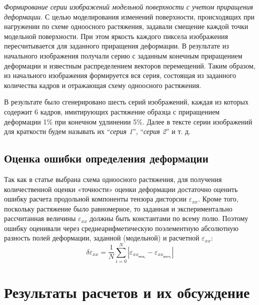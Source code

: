 \documentclass[a4paper]{jctart10}
\begin{document}
{\it Формирование серии изображений модельной поверхности с учетом приращения деформации.} С целью моделирования изменений поверхности, происходящих при нагружении по схеме одноосного растяжения, задавали смещение каждой точки модельной поверхности. При этом яркость каждого пиксела изображения пересчитывается для заданного приращения деформации. В результате из начального изображения получали серию с заданным конечным приращением деформации и известным распределением векторов перемещений. Таким образом, из начального изображения формируется вся серия, состоящая из заданного количества кадров и отражающая схему одноосного растяжения.

В результате было сгенерировано шесть серий изображений, каждая из которых содержит 6 кадров, имитирующих растяжение образца с приращением деформации 1\% при конечном удлинении 5\%. Далее в тексте серии изображений для краткости будем называть их ``{\it серия 1}'', ``{\it серия 2}'' и т. д.

\subsection{Оценка ошибки определения деформации}

Так как в статье выбрана схема одноосного растяжения, для получения количественной оценки «точности» оценки деформации достаточно оценить ошибку расчета продольной компоненты тензора дисторсии $\varepsilon_{xx}$. Кроме того, поскольку растяжение было равномерное, то заданная и экспериментально рассчитанная величины $\varepsilon_{xx}$ должны быть константами по всему полю. Поэтому ошибку оценивали через среднеарифметическую поэлементную абсолютную разность полей деформации, заданной (модельной) и расчетной $\varepsilon_{xx}$:
\begin{equation}
\delta\varepsilon_{xx} = \frac{1}{N}\sum^{N}_{i=0}|\varepsilon_{xx_{мод_{i}}}-\varepsilon_{xx_{расч_{i}}}|
\end{equation}

\section{Результаты расчетов и их обсуждение}
\end{document}
